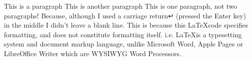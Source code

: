 \documentclass[12pt,a4paper]{article}
\begin{document}
This is a paragraph
This is another paragraph
This is one paragraph, not two paragraphs! Because, although I
used a carriage return↵
(pressed the Enter key) in the middle I didn't leave a blank
line. This is because this \LaTeX code specifies formatting,
and does not constitute formatting itself. i.e. \LaTeX is a
typesetting system and document markup language, unlike
Microsoft Word, Apple Pages or LibreOffice Writer which are
WYSIWYG Word Processors.
\end{document}
